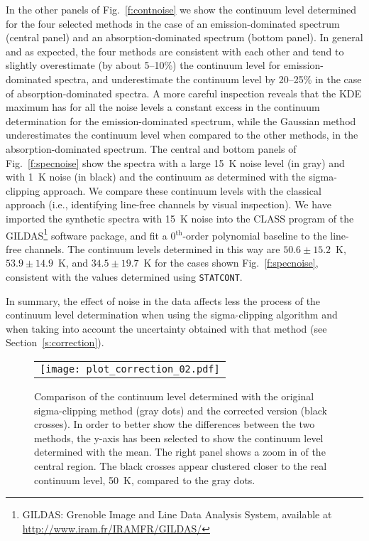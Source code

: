 \documentclass{aa}
\newcommand{\statcont} {\texttt{STATCONT}}
\begin{document}
In the other panels of Fig.~\ref{f:contnoise} we show the continuum level determined for the four selected methods in the case of an emission-dominated spectrum (central panel) and an absorption-dominated spectrum (bottom panel). In general and as expected, the four methods are consistent with each other and tend to slightly overestimate (by about 5--10\%) the continuum level for emission-dominated spectra, and underestimate the continuum level by 20--25\% in the case of absorption-dominated spectra. A more careful inspection reveals that the KDE maximum has for all the noise levels a constant excess in the continuum determination for the emission-dominated spectrum, while the Gaussian method underestimates the continuum level when compared to the other methods, in the absorption-dominated spectrum. The central and bottom panels of Fig.~\ref{f:specnoise} show the spectra with a large 15~K noise level (in gray) and with 1~K noise (in black) and the continuum as determined with the sigma-clipping approach. We compare these continuum levels with the classical approach (i.e., identifying line-free channels by visual inspection). We have imported the synthetic spectra with 15~K noise into the CLASS program of the GILDAS\footnote{GILDAS: Grenoble Image and Line Data Analysis System, available at \url{http://www.iram.fr/IRAMFR/GILDAS/}} software package, and fit a 0$^\mathrm{th}$-order polynomial baseline to the line-free channels. The continuum levels determined in this way are $50.6\pm15.2$~K, $53.9\pm14.9$~K, and $34.5\pm19.7$~K for the cases shown Fig.~\ref{f:specnoise}, consistent with the values determined using \statcont.

In summary, the effect of noise in the data affects less the process of the continuum level determination when using the sigma-clipping algorithm and when taking into account the uncertainty obtained with that method (see Section~\ref{s:correction}).

\begin{figure}[t]
\begin{center}
\begin{tabular}[b]{c}
        \texttt{[image: plot\_correction\_02.pdf]} \\
\end{tabular}
\caption{Comparison of the continuum level determined with the original sigma-clipping method (gray dots) and the corrected version (black crosses). In order to better show the differences between the two methods, the y-axis has been selected to show the continuum level determined with the mean. The right panel shows a zoom in of the central region. The black crosses appear clustered closer to the real continuum level, 50~K, compared to the gray dots.}
\label{f:correction}
\end{center}
\end{figure}
\end{document}
